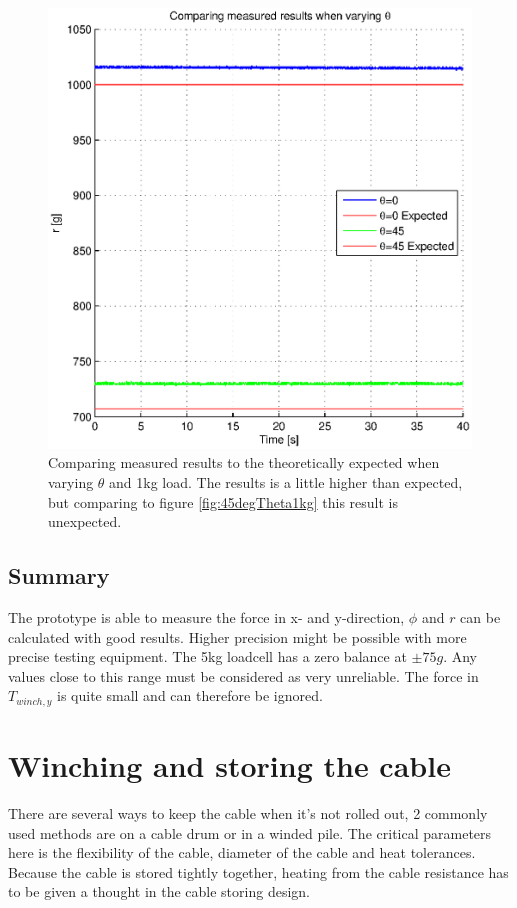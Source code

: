 \begin{figure}[H]
\centering
\includegraphics[scale=1]{graphics/gcs_test/Theta1kgCable.eps}
\caption[Comparing measured results to the theoretically expected, $\theta$ variable]{Comparing measured results to the theoretically expected when varying $\theta$ and 1kg load. The results is a little higher than expected, but comparing to figure \ref{fig:45degTheta1kg} this result is unexpected.}
\end{figure}




\subsection{Summary}
The prototype is able to measure the force in x- and y-direction, $\phi$ and $r$ can be calculated with good results. Higher precision might be possible with more precise testing equipment.
The 5kg loadcell has a zero balance at $\pm75g$. Any values close to this range must be considered as very unreliable. 
The force in $T_{winch,y}$ is quite small and can therefore be ignored.




\section{Winching and storing the cable}
There are several ways to keep the cable when it's not rolled out, 2 commonly used methods are on a cable drum or in a winded pile. The critical parameters here is the flexibility of the cable, diameter of the cable and heat tolerances.  Because the cable is stored tightly together, heating from the cable resistance has to be given a thought in the cable storing design.

